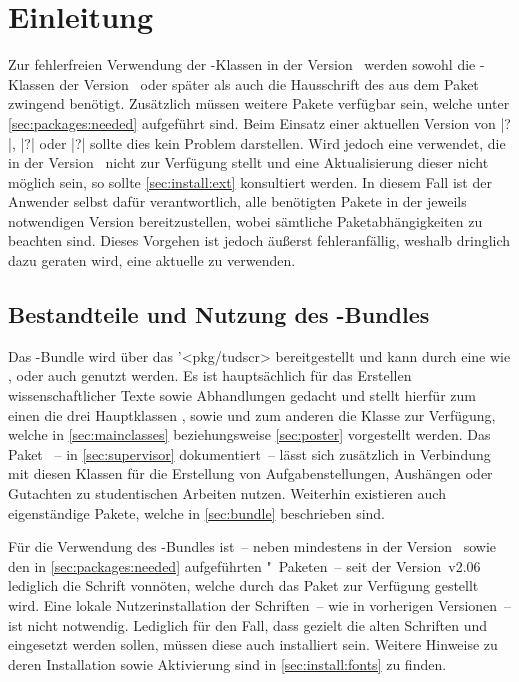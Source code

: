 \chapter{Einleitung}
%
Zur fehlerfreien Verwendung der \TUDScript-Klassen in der Version~\vTUDScript{} 
werden sowohl die \KOMAScript-Klassen der Version~\vKOMAScript{} oder später 
als auch die Hausschrift des \CDs \OpenSans aus dem Paket  
zwingend benötigt. Zusätzlich müssen weitere Pakete verfügbar sein, welche 
unter \autoref{sec:packages:needed} aufgeführt sind. Beim Einsatz einer 
aktuellen Version von \TeXLive|?|, \MacTeX|?| oder \MiKTeX|?| sollte dies kein 
Problem darstellen. Wird jedoch eine \DistributionGeneral verwendet, die 
\TUDScript in der Version~\vTUDScript{} nicht zur Verfügung stellt und eine 
Aktualisierung dieser nicht möglich sein, so sollte \autoref{sec:install:ext} 
konsultiert werden. In diesem Fall ist der Anwender selbst dafür 
verantwortlich, alle benötigten Pakete in der jeweils notwendigen Version 
bereitzustellen, wobei sämtliche Paketabhängigkeiten zu beachten sind. Dieses 
Vorgehen ist jedoch äußerst fehleranfällig, weshalb dringlich dazu geraten 
wird, eine aktuelle \DistributionGeneral zu verwenden.



\section{Bestandteile und Nutzung des \TUDScript-Bundles}
%
%
Das \TUDScript-Bundle wird über das \CTAN'<pkg/tudscr> bereitgestellt und kann 
durch eine \DistributionGeneral wie \TeXLive, \MacTeX oder auch \MiKTeX genutzt 
werden. Es ist hauptsächlich für das Erstellen wissenschaftlicher Texte sowie 
Abhandlungen gedacht und stellt hierfür zum einen die drei Hauptklassen 
,  sowie  und zum 
anderen die Klasse  zur Verfügung, welche in 
\autoref{sec:mainclasses} beziehungsweise \autoref{sec:poster} vorgestellt 
werden. Das Paket ~-- in \autoref{sec:supervisor} 
dokumentiert~-- lässt sich zusätzlich in Verbindung mit diesen Klassen für die 
Erstellung von Aufgabenstellungen, Aushängen oder Gutachten zu studentischen 
Arbeiten nutzen. Weiterhin existieren auch eigenständige Pakete, welche in 
\autoref{sec:bundle} beschrieben sind. 

Für die Verwendung des \TUDScript-Bundles ist~-- neben \KOMAScript mindestens 
in der Version~\vKOMAScript{} sowie den in \autoref{sec:packages:needed} 
aufgeführten "~Paketen~-- seit der Version~v2.06 lediglich die 
Schrift \OpenSans vonnöten, welche durch das Paket  zur 
Verfügung gestellt wird. Eine lokale Nutzerinstallation der Schriften~-- wie in 
vorherigen Versionen~-- ist nicht notwendig. Lediglich für den Fall, dass 
gezielt die alten Schriften \Univers und \DIN eingesetzt werden sollen, müssen 
diese auch installiert sein. Weitere Hinweise zu deren Installation sowie 
Aktivierung sind in \autoref{sec:install:fonts} zu finden.

